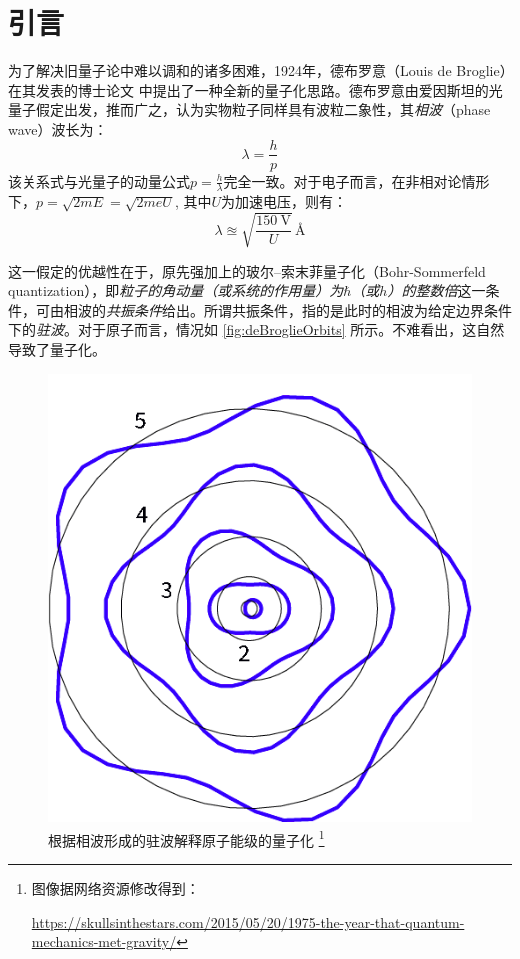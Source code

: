 \documentclass[aps,pre,12pt,preprint,%
	onecolumn,showpacs,showkeys,nofootinbib]{revtex4-1}
\begin{document}
\section{引言}
	为了解决旧量子论中难以调和的诸多困难，1924年，德布罗意（Louis de Broglie）在其发表的博士论文 \cite{de1924recherches} 中提出了一种全新的量子化思路。德布罗意由爱因斯坦的光量子假定出发，推而广之，认为实物粒子同样具有波粒二象性，其\textit{相波}（phase wave）波长为：
	\begin{equation}
		\lambda = \frac{h}{p}
	\end{equation}
	该关系式与光量子的动量公式$p = \frac{h}{\lambda}$完全一致。对于电子而言，在非相对论情形下，$p = \sqrt{2mE} = \sqrt{2meU}$, 其中$U$为加速电压，则有：
	\begin{equation}
		\lambda \approxeq \sqrt{\frac{\SI{150}{\V}}{U}}\,\si{\angstrom}
		\label{eq:deBroglieLambda}
	\end{equation}
	
	这一假定的优越性在于，原先强加上的玻尔--索末菲量子化（Bohr-Sommerfeld quantization），即\textit{粒子的角动量（或系统的作用量）为$\hbar$（或$h$）的整数倍}这一条件，可由相波的\textit{共振条件}给出。所谓共振条件，指的是此时的相波为给定边界条件下的\textit{驻波}。对于原子而言，情况如 \autoref{fig:deBroglieOrbits} 所示。不难看出，这自然导致了量子化。
	\begin{figure}[!ht]
	\centering
	\includegraphics[width=.35\linewidth]{deBroglieOrbits.png}
	\caption[根据相波形成的驻波解释原子能级的量子化]{%
		根据相波形成的驻波解释原子能级的量子化%
		\vspace{3ex}
		\footnote{%
			图像据网络资源修改得到：\par
			\noindent\fontsize{9pt}{\parskip}%
			\url{https://skullsinthestars.com/2015/05/20/1975-the-year-that-quantum-mechanics-met-gravity/}}%
		}
	\label{fig:deBroglieOrbits}
	\end{figure}
	
\end{document}
